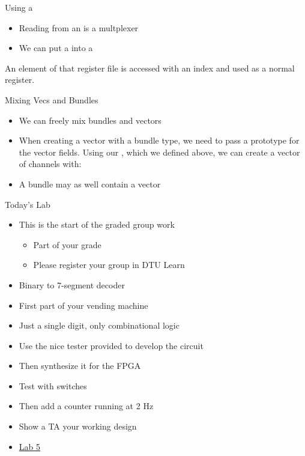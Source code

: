 \begin{frame}[fragile]{Using a }
\begin{itemize}
\item Reading from an  is a multplexer
\item We can put a  into a 
\end{itemize}
\noindent An element of that register file is accessed with an index and used as a normal register.

\end{frame}


\begin{frame}[fragile]{Mixing Vecs and Bundles}
\begin{itemize}
\item We can freely mix bundles and vectors
\item When creating a vector with a bundle
type, we need to pass a prototype for the vector fields. Using our
, which we defined above, we can create a vector of channels with:
\end{itemize}
\begin{itemize}
\item A bundle may as well contain a vector
\end{itemize}
\end{frame}

\begin{frame}[fragile]{Today's Lab}
\begin{itemize}
\item This is the start of the graded group work
\begin{itemize}
\item Part of your grade
\item Please register your group in DTU Learn
\end{itemize}
\item Binary to 7-segment decoder
\item First part of your vending machine
\item Just a single digit, only combinational logic
\item Use the nice tester provided to develop the circuit
\item Then synthesize it for the FPGA
\item Test with switches
\item Then add a counter running at 2 Hz
\item Show a TA your working design
\item \href{https://github.com/schoeberl/chisel-lab/tree/master/lab5}{Lab 5}
\end{itemize}
\end{frame}



